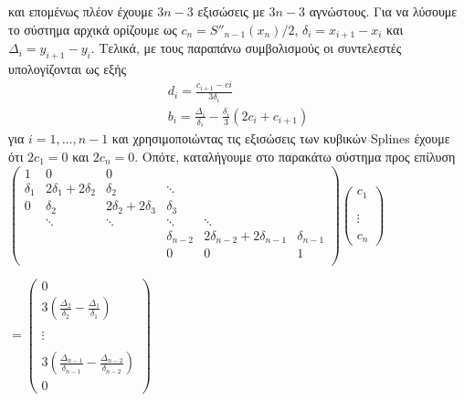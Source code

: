 \documentclass[Second Project.tex]{subfiles}
\begin{document}
και επομένως πλέον έχουμε $3n-3$ εξισώσεις με $3n-3$ αγνώστους. Για να λύσουμε το σύστημα αρχικά ορίζουμε ως $c_{n} = S''_{n-1}(x_{n})/2$,
$\delta_{i} = x_{i+1} - x_{i}$ και $ \Delta_{i} = y_{i+1}-y_{i}$. Τελικά, με τους παραπάνω συμβολισμούς οι συντελεστές υπολογίζονται ως εξής
\begin{gather*}
    d_{i} = \frac{c_{i+1}-c{i}}{3\delta_{i}} \\
    b_{i} = \frac{\Delta_{i}}{\delta_{i}} - \frac{\delta_{i}}{3}(2c_{i} + c_{i+1})
\end{gather*}
για $i = 1, \dots, n-1$ και χρησιμοποιώντας τις εξισώσεις των κυβικών \textlatin{Splines} έχουμε ότι $2c_{1}=0$ και $2c_{n}=0$. Οπότε,
καταλήγουμε στο παρακάτω σύστημα προς επίλυση \\

\vspace{10mm}
$
\begin{pmatrix}
    1 & 0 & 0 &  &  & \\
    \delta_{1} & 2\delta_{1} + 2\delta_{2} & \delta_{2} & \ddots & & \\
    0 & \delta_{2} & 2\delta_{2} + 2\delta_{3} & \delta_{3} &  & \\ 
     & \ddots & \ddots & \ddots & \ddots & \\
     & &  & \delta_{n-2} & 2\delta_{n-2} + 2\delta_{n-1} & \delta_{n-1}\\
     & &  & 0 & 0 & 1\\
\end{pmatrix}
\begin{pmatrix}
    c_{1} \\
     \\
     \\
    \vdots \\
     \\
    c_{n}
\end{pmatrix}
$

$=
\begin{pmatrix}
    0 \\
    3(\frac{\Delta_{2}}{\delta_{2}} - \frac{\Delta_{1}}{\delta_{1}}) \\
     \\
    \vdots \\
     \\
     3(\frac{\Delta_{n-1}}{\delta_{n-1}} - \frac{\Delta_{n-2}}{\delta_{n-2}}) \\
    0
\end{pmatrix}
$
\end{document}
